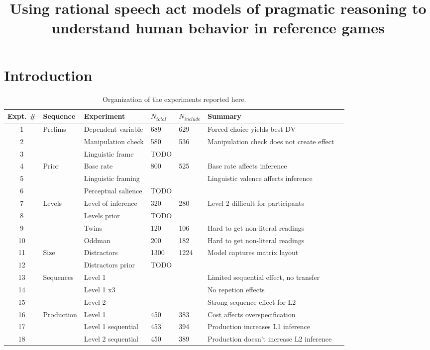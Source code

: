 \documentclass[man,noapacite]{apa2}
\title{\vspace{-16ex}Using rational speech act models of pragmatic reasoning to understand human behavior in reference games}
\begin{document}
\maketitle                            


\section{Introduction}







\begin{table}
\caption{Organization of the experiments reported here.}
\begin{tabular}{cllllll}
\hline
Expt. \# & Sequence & Experiment & $N_{total}$ & $N_{include}$ & Summary \\
\hline
1 & Prelims & Dependent variable & 689 & 629 & Forced choice yields best DV \\
2 & & Manipulation check & 580 & 536 & Manipulation check does not create effect \\
3 & & Linguistic frame & TODO & & \\
4 & Prior & Base rate & 800 & 525 & Base rate affects inference \\
5 &  & Linguistic framing & & & Linguistic valence affects inference\\
6 &  & Perceptual salience & TODO & & \\
7 & Levels & Level of inference & 320 & 280 & Level 2 difficult for participants \\
8 &    & Levels prior & TODO &  & \\
9 &    & Twins & 120 & 106  & Hard to get non-literal readings\\
10 &    & Oddman & 200 & 182  & Hard to get non-literal readings\\
11 & Size  & Distractors & 1300 & 1224 & Model captures matrix layout\\
12 &  & Distractors prior & TODO & & \\
13 & Sequences & Level 1 & & & Limited sequential effect, no transfer \\
14 & & Level 1 x3 & & & No repetion effects \\
15 & & Level 2 & & & Strong sequence effect for L2 \\
16 & Production & Level 1 & 450 & 383 & Cost affects overspecification\\
17 & & Level 1 sequential & 453 & 394 & Production increases L1 inference\\
18 & & Level 2 sequential & 450 & 389 & Production doesn't increase L2 inference\\
\hline
\end{tabular}
\end{table}
\end{document}
